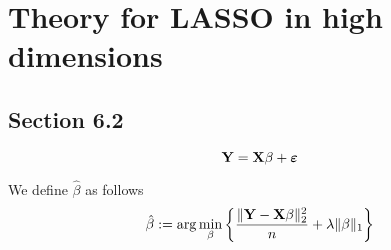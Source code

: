 \chapter{Theory for LASSO in high dimensions}


\section{Section 6.2}
\begin{equation}
    \label{def: linear model (matrix)}
    \mathbf{Y} = \mathbf{X} \beta + \boldsymbol{\varepsilon}
\end{equation}

We define $\hat \beta$ as follows
\begin{equation}
    \label{not: beta hat}
    \hat{\beta}:=\arg \min _{\beta}\left\{\frac{\|\mathbf{Y}-\mathbf{X} \beta\|_{2}^{2}}{n}+\lambda\|\beta\|_{1}\right\}
\end{equation}


